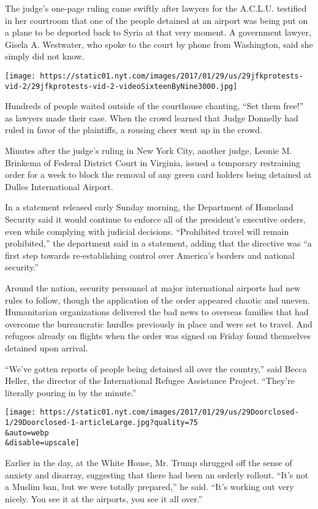 The judge's one-page ruling came swiftly after lawyers for the A.C.L.U.
testified in her courtroom that one of the people detained at an airport
was being put on a plane to be deported back to Syria at that very
moment. A government lawyer, Gisela A. Westwater, who spoke to the court
by phone from Washington, said she simply did not know.

\texttt{[image: https://static01.nyt.com/images/2017/01/29/us/29jfkprotests-vid-2/29jfkprotests-vid-2-videoSixteenByNine3000.jpg]}

Hundreds of people waited outside of the courthouse chanting, ``Set them
free!'' as lawyers made their case. When the crowd learned that Judge
Donnelly had ruled in favor of the plaintiffs, a rousing cheer went up
in the crowd.

Minutes after the judge's ruling in New York City, another judge, Leonie
M. Brinkema of Federal District Court in Virginia, issued a temporary
restraining order for a week to block the removal of any green card
holders being detained at Dulles International Airport.

In a statement released early Sunday morning, the Department of Homeland
Security said it would continue to enforce all of the president's
executive orders, even while complying with judicial decisions.
``Prohibited travel will remain prohibited,'' the department said in a
statement, adding that the directive was ``a first step towards
re-establishing control over America's borders and national security.''

Around the nation, security personnel at major international airports
had new rules to follow, though the application of the order appeared
chaotic and uneven. Humanitarian organizations delivered the bad news to
overseas families that had overcome the bureaucratic hurdles previously
in place and were set to travel. And refugees already on flights when
the order was signed on Friday found themselves detained upon arrival.

``We've gotten reports of people being detained all over the country,''
said Becca Heller, the director of the International Refugee Assistance
Project. ``They're literally pouring in by the minute.''

\texttt{[image: https://static01.nyt.com/images/2017/01/29/us/29Doorclosed-1/29Doorclosed-1-articleLarge.jpg?quality=75\\\&auto=webp\\\&disable=upscale]}

Earlier in the day, at the White House, Mr. Trump shrugged off the sense
of anxiety and disarray, suggesting that there had been an orderly
rollout. ``It's not a Muslim ban, but we were totally prepared,'' he
said. ``It's working out very nicely. You see it at the airports, you
see it all over.''


